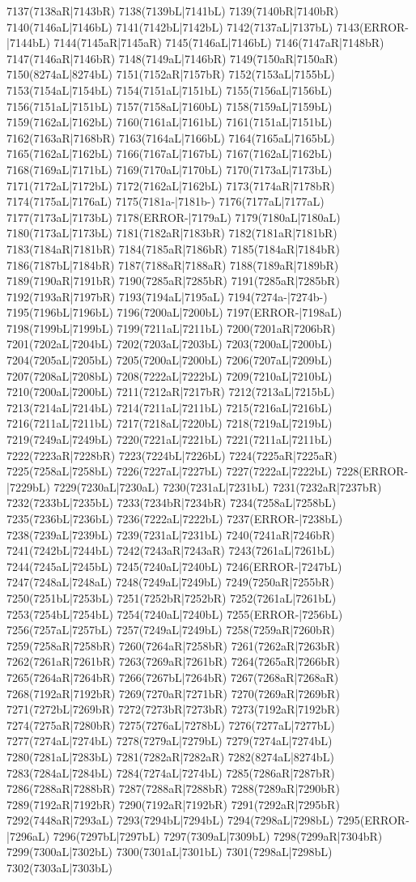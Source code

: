 7137(7138aR|7143bR) 7138(7139bL|7141bL) 7139(7140bR|7140bR) 7140(7146aL|7146bL) 7141(7142bL|7142bL) 7142(7137aL|7137bL) 7143(ERROR-|7144bL) 7144(7145aR|7145aR) 7145(7146aL|7146bL) 7146(7147aR|7148bR) 7147(7146aR|7146bR) 7148(7149aL|7146bR) 7149(7150aR|7150aR) 7150(8274aL|8274bL) 7151(7152aR|7157bR) 7152(7153aL|7155bL) 7153(7154aL|7154bL) 7154(7151aL|7151bL) 7155(7156aL|7156bL) 7156(7151aL|7151bL) 7157(7158aL|7160bL) 7158(7159aL|7159bL) 7159(7162aL|7162bL) 7160(7161aL|7161bL) 7161(7151aL|7151bL) 7162(7163aR|7168bR) 7163(7164aL|7166bL) 7164(7165aL|7165bL) 7165(7162aL|7162bL) 7166(7167aL|7167bL) 7167(7162aL|7162bL) 7168(7169aL|7171bL) 7169(7170aL|7170bL) 7170(7173aL|7173bL) 7171(7172aL|7172bL) 7172(7162aL|7162bL) 7173(7174aR|7178bR) 7174(7175aL|7176aL) 7175(7181a-|7181b-) 7176(7177aL|7177aL) 7177(7173aL|7173bL) 7178(ERROR-|7179aL) 7179(7180aL|7180aL) 7180(7173aL|7173bL) 7181(7182aR|7183bR) 7182(7181aR|7181bR) 7183(7184aR|7181bR) 7184(7185aR|7186bR) 7185(7184aR|7184bR) 7186(7187bL|7184bR) 7187(7188aR|7188aR) 7188(7189aR|7189bR) 7189(7190aR|7191bR) 7190(7285aR|7285bR) 7191(7285aR|7285bR) 7192(7193aR|7197bR) 7193(7194aL|7195aL) 7194(7274a-|7274b-) 7195(7196bL|7196bL) 7196(7200aL|7200bL) 7197(ERROR-|7198aL) 7198(7199bL|7199bL) 7199(7211aL|7211bL) 7200(7201aR|7206bR) 7201(7202aL|7204bL) 7202(7203aL|7203bL) 7203(7200aL|7200bL) 7204(7205aL|7205bL) 7205(7200aL|7200bL) 7206(7207aL|7209bL) 7207(7208aL|7208bL) 7208(7222aL|7222bL) 7209(7210aL|7210bL) 7210(7200aL|7200bL) 7211(7212aR|7217bR) 7212(7213aL|7215bL) 7213(7214aL|7214bL) 7214(7211aL|7211bL) 7215(7216aL|7216bL) 7216(7211aL|7211bL) 7217(7218aL|7220bL) 7218(7219aL|7219bL) 7219(7249aL|7249bL) 7220(7221aL|7221bL) 7221(7211aL|7211bL) 7222(7223aR|7228bR) 7223(7224bL|7226bL) 7224(7225aR|7225aR) 7225(7258aL|7258bL) 7226(7227aL|7227bL) 7227(7222aL|7222bL) 7228(ERROR-|7229bL) 7229(7230aL|7230aL) 7230(7231aL|7231bL) 7231(7232aR|7237bR) 7232(7233bL|7235bL) 7233(7234bR|7234bR) 7234(7258aL|7258bL) 7235(7236bL|7236bL) 7236(7222aL|7222bL) 7237(ERROR-|7238bL) 7238(7239aL|7239bL) 7239(7231aL|7231bL) 7240(7241aR|7246bR) 7241(7242bL|7244bL) 7242(7243aR|7243aR) 7243(7261aL|7261bL) 7244(7245aL|7245bL) 7245(7240aL|7240bL) 7246(ERROR-|7247bL) 7247(7248aL|7248aL) 7248(7249aL|7249bL) 7249(7250aR|7255bR) 7250(7251bL|7253bL) 7251(7252bR|7252bR) 7252(7261aL|7261bL) 7253(7254bL|7254bL) 7254(7240aL|7240bL) 7255(ERROR-|7256bL) 7256(7257aL|7257bL) 7257(7249aL|7249bL) 7258(7259aR|7260bR) 7259(7258aR|7258bR) 7260(7264aR|7258bR) 7261(7262aR|7263bR) 7262(7261aR|7261bR) 7263(7269aR|7261bR) 7264(7265aR|7266bR) 7265(7264aR|7264bR) 7266(7267bL|7264bR) 7267(7268aR|7268aR) 7268(7192aR|7192bR) 7269(7270aR|7271bR) 7270(7269aR|7269bR) 7271(7272bL|7269bR) 7272(7273bR|7273bR) 7273(7192aR|7192bR) 7274(7275aR|7280bR) 7275(7276aL|7278bL) 7276(7277aL|7277bL) 7277(7274aL|7274bL) 7278(7279aL|7279bL) 7279(7274aL|7274bL) 7280(7281aL|7283bL) 7281(7282aR|7282aR) 7282(8274aL|8274bL) 7283(7284aL|7284bL) 7284(7274aL|7274bL) 7285(7286aR|7287bR) 7286(7288aR|7288bR) 7287(7288aR|7288bR) 7288(7289aR|7290bR) 7289(7192aR|7192bR) 7290(7192aR|7192bR) 7291(7292aR|7295bR) 7292(7448aR|7293aL) 7293(7294bL|7294bL) 7294(7298aL|7298bL) 7295(ERROR-|7296aL) 7296(7297bL|7297bL) 7297(7309aL|7309bL) 7298(7299aR|7304bR) 7299(7300aL|7302bL) 7300(7301aL|7301bL) 7301(7298aL|7298bL) 7302(7303aL|7303bL) 